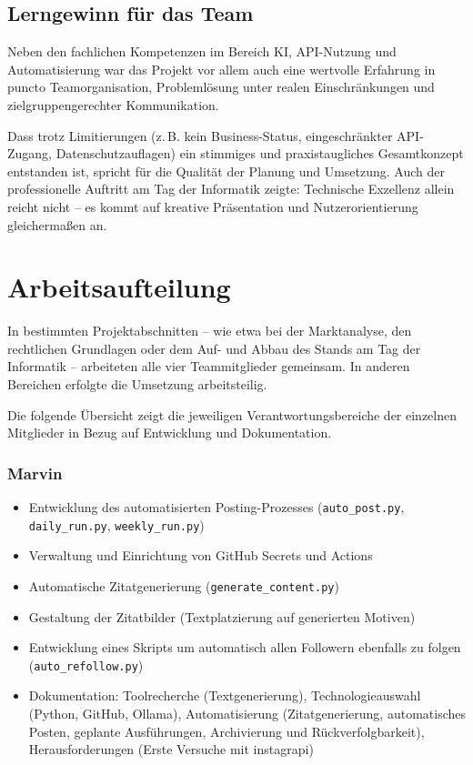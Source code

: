 \documentclass[a4paper,12pt]{article}
\begin{document}
\subsection{Lerngewinn für das Team}

Neben den fachlichen Kompetenzen im Bereich KI, API-Nutzung und Automatisierung war das Projekt vor allem auch eine wertvolle Erfahrung in puncto Teamorganisation, Problemlösung unter realen Einschränkungen und zielgruppengerechter Kommunikation.

Dass trotz Limitierungen (z.\,B. kein Business-Status, eingeschränkter API-Zugang, Datenschutzauflagen) ein stimmiges und praxistaugliches Gesamtkonzept entstanden ist, spricht für die Qualität der Planung und Umsetzung. Auch der professionelle Auftritt am Tag der Informatik zeigte: Technische Exzellenz allein reicht nicht – es kommt auf kreative Präsentation und Nutzerorientierung gleichermaßen an.


\section{Arbeitsaufteilung}
In bestimmten Projektabschnitten – wie etwa bei der Marktanalyse, den rechtlichen Grundlagen oder dem Auf- und Abbau des Stands am Tag der Informatik – arbeiteten alle vier Teammitglieder gemeinsam. In anderen Bereichen erfolgte die Umsetzung arbeitsteilig.

Die folgende Übersicht zeigt die jeweiligen Verantwortungsbereiche der einzelnen Mitglieder in Bezug auf Entwicklung und Dokumentation.

\subsubsection*{Marvin}

\begin{itemize}
    \item Entwicklung des automatisierten Posting-Prozesses (\texttt{auto\_post.py}, \texttt{daily\_run.py}, \texttt{weekly\_run.py})
    \item Verwaltung und Einrichtung von GitHub Secrets und Actions
    \item Automatische Zitatgenerierung (\texttt{generate\_content.py})
    \item Gestaltung der Zitatbilder (Textplatzierung auf generierten Motiven)
    \item Entwicklung eines Skripts um automatisch allen Followern ebenfalls zu folgen (\texttt{auto\_refollow.py})
    \item Dokumentation: Toolrecherche (Textgenerierung), Technologieauswahl (Python, GitHub, Ollama), Automatisierung (Zitatgenerierung, automatisches Posten, geplante Ausführungen, Archivierung und Rückverfolgbarkeit), Herausforderungen (Erste Versuche mit instagrapi)
\end{itemize}
\end{document}
